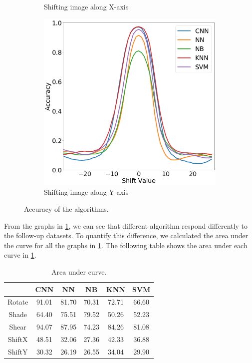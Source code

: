\begin{figure}[htb!]
\begin{subfigure}[b]{0.3\textwidth}
        \caption{Shifting image along X-axis}
    \end{subfigure}
    \begin{subfigure}[b]{0.3\textwidth}
        \centering
         \includegraphics[width=\textwidth]{chapters/results/MT/ShiftY.png}
        \caption{Shifting image along Y-axis}
    \end{subfigure}
    \caption{Accuracy of the algorithms.}
    \label{fig:Accuracy}
    \end{figure}

 From the graphs in \ref{fig:Accuracy}, we can see that different algorithm respond differently to the follow-up datasets. To quantify this difference, we calculated the area under the curve for all the graphs in \ref{fig:Accuracy}. The following table shows the area under each curve in \ref{fig:Accuracy}.\\
    \begin{table}[H]
    \centering
        \begin{tabular}{|c|c|c|c|c|c|}
        \hline
         & CNN & NN & NB & KNN & SVM \\
         \hline
        Rotate & 91.01 & 81.70 & 70.31 & 72.71 & 66.60  \\
        \hline
        Shade & 64.40 & 75.51 & 79.52 & 50.26 & 52.23 \\
        \hline
        Shear & 94.07 & 87.95 & 74.23 & 84.26 & 81.08 \\
        \hline
        ShiftX & 48.51 & 32.06 & 27.36 & 42.33 & 36.88 \\
        \hline
        ShiftY & 30.32 & 26.19 & 26.55 & 34.04 & 29.90 \\
        \hline
        \end{tabular}
        \caption{Area under curve.}
        \label{tbl:rot-file-format}
    \end{table}
    

